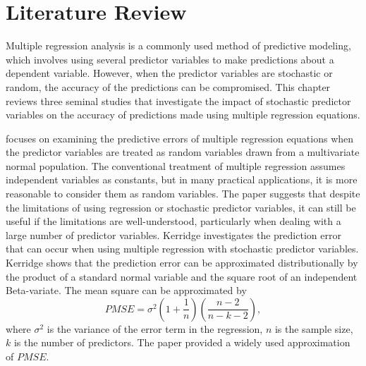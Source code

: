 


\chapter{Literature Review}

Multiple regression analysis is a commonly used method of predictive modeling, which involves using several predictor variables to make predictions about a dependent variable. However, when the predictor variables are stochastic or random, the accuracy of the predictions can be compromised. This chapter reviews three seminal studies that investigate the impact of stochastic predictor variables on the accuracy of predictions made using multiple regression equations.

\cite{kerridge1967errors}focuses on examining the predictive errors of multiple regression equations when the predictor variables are treated as random variables drawn from a multivariate normal population. The conventional treatment of multiple regression assumes independent variables as constants, but in many practical applications, it is more reasonable to consider them as random variables. The paper suggests that despite the limitations of using regression or stochastic predictor variables, it can still be useful if the limitations are well-understood, particularly when dealing with a large number of predictor variables. Kerridge investigates the prediction error that can occur when using multiple regression with stochastic predictor variables. Kerridge shows that the prediction error can be approximated distributionally by the product of a standard normal variable and the square root of an independent Beta-variate. The mean square can be approximated by 
\begin{equation}\label{eq:kerridge}
PMSE = \sigma^2\left(1+\frac{1}{n}\right)\left(\frac{n-2}{n-k-2}\right),
\end{equation}
where $\sigma^2$ is the variance of the error term in the regression, $n$ is the sample size, $k$ is the number of predictors. The paper provided a widely used approximation of $PMSE$.

